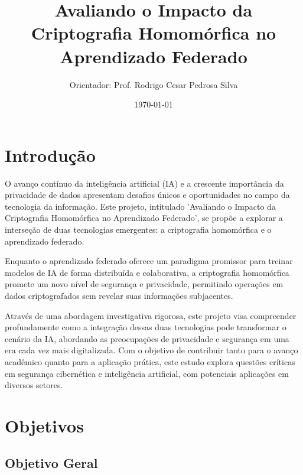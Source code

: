 \documentclass{article}
\title{Avaliando o Impacto da Criptografia Homomórfica no Aprendizado Federado
}
\author{Orientador: Prof. Rodrigo Cesar Pedrosa Silva}
\date{\today}
\begin{document}
\maketitle


   

\section{Introdução}

O avanço contínuo da inteligência artificial (IA) e a crescente importância da privacidade de dados apresentam desafios únicos e oportunidades no campo da tecnologia da informação. Este projeto, intitulado 'Avaliando o Impacto da Criptografia Homomórfica no Aprendizado Federado', se propõe a explorar a interseção de duas tecnologias emergentes: a criptografia homomórfica e o aprendizado federado. 

Enquanto o aprendizado federado oferece um paradigma promissor para treinar modelos de IA de forma distribuída e colaborativa, a criptografia homomórfica promete um novo nível de segurança e privacidade, permitindo operações em dados criptografados sem revelar suas informações subjacentes. 

Através de uma abordagem investigativa rigorosa, este projeto visa compreender profundamente como a integração dessas duas tecnologias pode transformar o cenário da IA, abordando as preocupações de privacidade e segurança em uma era cada vez mais digitalizada. Com o objetivo de contribuir tanto para o avanço acadêmico quanto para a aplicação prática, este estudo explora questões críticas em segurança cibernética e inteligência artificial, com potenciais aplicações em diversos setores.

\section{Objetivos}

\subsection{Objetivo Geral}
\end{document}
